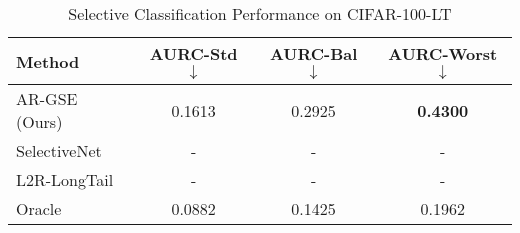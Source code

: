 \begin{table}[t]
\centering
\caption{Selective Classification Performance on CIFAR-100-LT}
\label{tab:main_results}
\begin{tabular}{lccc}
\toprule
\textbf{Method} & \textbf{AURC-Std} $\downarrow$ & \textbf{AURC-Bal} $\downarrow$ & \textbf{AURC-Worst} $\downarrow$ \\
\midrule
AR-GSE (Ours) & 0.1613 & 0.2925 & \textbf{0.4300} \\
SelectiveNet & - & - & - \\
L2R-LongTail & - & - & - \\
\midrule
Oracle & 0.0882 & 0.1425 & 0.1962 \\
\bottomrule
\end{tabular}
\end{table}
